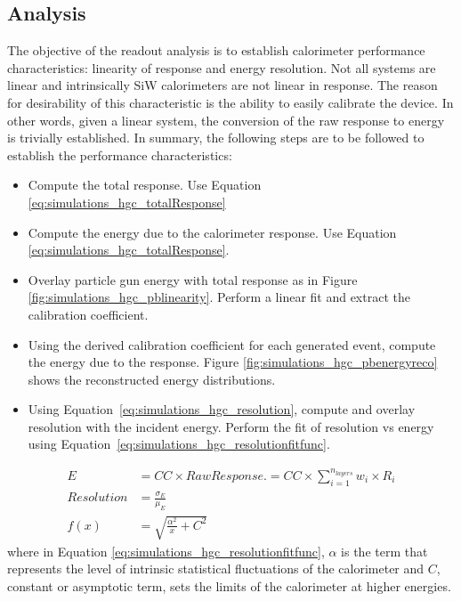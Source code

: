 \subsection{Analysis}
The objective of the readout analysis is to establish calorimeter performance characteristics: linearity of response and energy resolution. Not all systems are linear and intrinsically SiW calorimeters are not linear in response. The reason for desirability of this characteristic is the ability to easily calibrate the device. In other words, given a linear system, the conversion of the raw response to energy is trivially established. In summary, the following steps are to be followed to establish the performance characteristics:
\begin{itemize}
    \item Compute the total response. Use Equation \ref{eq:simulations_hgc_totalResponse}
    \item Compute the energy due to the calorimeter response. Use Equation \ref{eq:simulations_hgc_totalResponse}.
    \item Overlay particle gun energy with total response as in Figure \ref{fig:simulations_hgc_pblinearity}. Perform a linear fit and extract the calibration coefficient.
    \item Using the derived calibration coefficient for each generated event, compute the energy due to the response. Figure \ref{fig:simulations_hgc_pbenergyreco} shows the reconstructed energy distributions.
    \item Using Equation~\ref{eq:simulations_hgc_resolution}, compute and overlay resolution with the incident energy. Perform the fit of resolution vs energy using Equation~\ref{eq:simulations_hgc_resolutionfitfunc}.
\end{itemize}
\begin{subequations}\label{eq:simulations_hgc_definitions}
\begin{align}
    E& = {CC} \times {Raw Response}. = {CC} \times {\sum_{i=1}^{n_{layers}} w_i \times  R_{i}}\label{eq:simulations_hgc_totalResponse}\\
    {Resolution}& = {\frac{\sigma_E}{\mu_E}}\label{eq:simulations_hgc_resolution}\\
    {f(x)}& = {\sqrt{\frac{\alpha^2}{x} + C^2}}\label{eq:simulations_hgc_resolutionfitfunc}
\end{align}
\end{subequations}
where in Equation \ref{eq:simulations_hgc_resolutionfitfunc}, $\alpha$ is the term that represents the level of intrinsic statistical fluctuations of the calorimeter and $C$, constant or asymptotic term, sets the limits of the calorimeter at higher energies.


